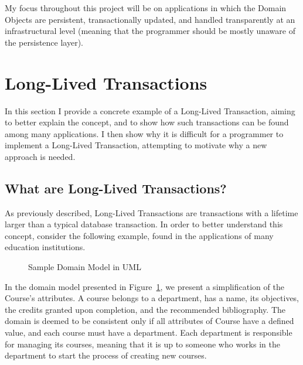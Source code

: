 \documentclass{llncs}
\begin{document}
My focus throughout this project will be on applications in which the
Domain Objects are persistent, transactionally updated, and handled
transparently at an infrastructural level (meaning that the programmer
should be mostly unaware of the persistence layer).

\section{Long-Lived Transactions}

In this section I provide a concrete example of a Long-Lived
Transaction, aiming to better explain the concept, and to show how
such transactions can be found among many applications. I then show
why it is difficult for a programmer to implement a Long-Lived
Transaction, attempting to motivate why a new approach is needed.

\subsection{What are Long-Lived Transactions?}
\label{sec:what}

As previously described, Long-Lived Transactions are transactions with
a lifetime larger than a typical database transaction. In order to
better understand this concept, consider the following example, found
in the applications of many education institutions.

\begin{figure}
  \centering

\caption{Sample Domain Model in UML}
\label{fig:courseDomain}

\end{figure}

In the domain model presented in Figure~\ref{fig:courseDomain}, we
present a simplification of the Course's attributes. A course belongs
to a department, has a name, its objectives, the credits granted upon
completion, and the recommended bibliography. The domain is deemed to
be consistent only if all attributes of Course have a defined value,
and each course must have a department. Each department is responsible
for managing its courses, meaning that it is up to someone who works
in the department to start the process of creating new courses.
\end{document}
